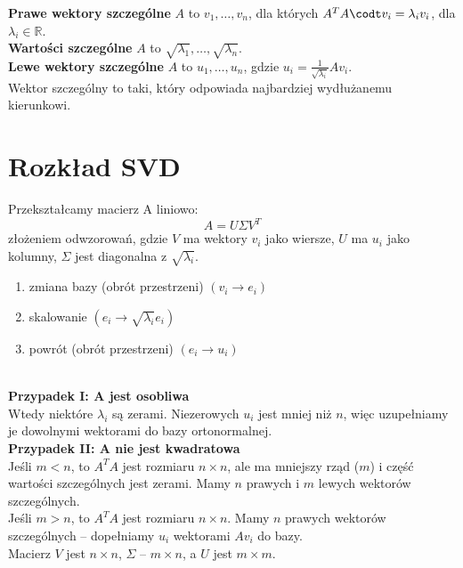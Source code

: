 \textbf{Prawe wektory szczególne} \( A \) to \( v_1, \dots, v_n \), dla których \( A^TA \codt v_i = \lambda_iv_i \), dla \( \lambda_i \in \mathbb{R} \). \\
\textbf{Wartości szczególne} \( A \) to \( \sqrt{\lambda_1}, \dots, \sqrt{\lambda_n} \). \\
\textbf{Lewe wektory szczególne} \( A \) to \( u_1, \dots, u_n \), gdzie \( u_i = \frac{1}{\sqrt{\lambda_i}}A v_i \). \\
Wektor szczególny to taki, który odpowiada najbardziej wydłużanemu kierunkowi.

\section{Rozkład SVD}
Przekształcamy macierz A liniowo:
\[
    A = U\Sigma V^T
\]
złożeniem odwzorowań, gdzie \( V \) ma wektory \( v_i \)  jako wiersze, \( U \) ma \( u_i \) jako kolumny, \( \Sigma \) jest diagonalna z \( \sqrt{\lambda_i} \).
\begin{enumerate}
\singlespacing
    \item zmiana bazy (obrót przestrzeni) \( (v_i \rightarrow e_i) \)
    \item skalowanie \( (e_i \rightarrow \sqrt{\lambda_i} e_i) \)
    \item powrót (obrót przestrzeni) \( (e_i \rightarrow u_i) \)
\end{enumerate} \\
\textbf{Przypadek I: A jest osobliwa} \\
Wtedy niektóre \( \lambda_i \) są zerami. Niezerowych \( u_i \) jest mniej niż \( n \), więc uzupełniamy je dowolnymi wektorami do bazy ortonormalnej. \\
\textbf{Przypadek II: A nie jest kwadratowa} \\
Jeśli \( m < n \), to \( A^TA \) jest rozmiaru \( n \times n \), ale ma mniejszy rząd (\( m \)) i część wartości szczególnych jest zerami. Mamy \( n \) prawych i \( m \) lewych wektorów szczególnych. \\
Jeśli \( m > n \), to \( A^TA \) jest rozmiaru \( n \times n \). Mamy \( n \) prawych wektorów szczególnych – dopełniamy \( u_i \) wektorami \( Av_i \) do bazy. \\
Macierz \( V \) jest \( n \times n \), \( \Sigma \) – \( m \times n \), a \( U \) jest \( m \times m \).